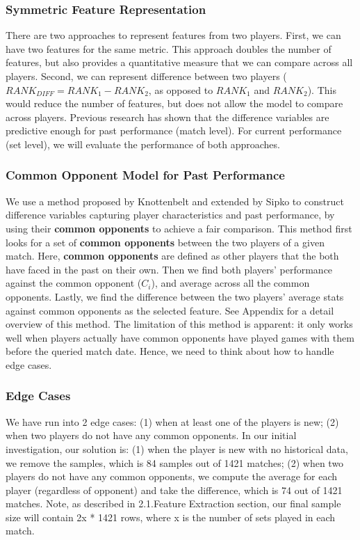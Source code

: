\documentclass[paper=a4, fontsize=11pt]{scrartcl} %
\numberwithin{equation}{section} %
\numberwithin{figure}{section} %
\numberwithin{table}{section} %
\begin{document}
\subsubsection{Symmetric Feature Representation}
There are two approaches to represent features from two players.  First, we can have two features for the same metric.  This approach doubles the number of features, but also provides a quantitative measure that we can compare across all players.  Second, we can represent difference between two players ($RANK_{DIFF} = RANK_1 - RANK_2$, as opposed to $RANK_1$ and $RANK_2$).  This would reduce the number of features, but does not allow the model to compare across players.  Previous research has shown that the difference variables are predictive enough \cite{tennis1} \cite{omalley} for past performance (match level).  For current performance (set level), we will evaluate the performance of both approaches.  
\subsubsection{Common Opponent Model for Past Performance}
We use a method proposed by Knottenbelt \cite{KNOTTENBELT20123820} and extended by Sipko \cite{tennis1} to construct difference variables capturing player characteristics and past performance, by using their \textbf{common opponents} to achieve a fair comparison. 
This method first looks for a set of \textbf{common opponents} between the two players of a given match. Here, \textbf{common opponents} are defined as other players that the both have faced in the past on their own. Then we find both players' performance against the common opponent ($C_i$), and average across all the common opponents. Lastly, we find the difference between the two players' average stats against common opponents as the selected feature.  See Appendix for a detail overview of this method.
The limitation of this method is apparent: it only works well when players actually have common opponents have played games with them before the queried match date. Hence, we need to think about how to handle edge cases.
\subsubsection{Edge Cases}
We have run into 2 edge cases: (1) when at least one of the players is new; (2) when two players do not have any common opponents.  In our initial investigation, our solution is: (1) when the player is new with no historical data, we remove the samples, which is 84 samples out of 1421 matches; (2) when two players do not have any common opponents, we compute the average for each player (regardless of opponent) and take the difference, which is 74 out of 1421 matches. Note, as described in 2.1.Feature Extraction section, our final sample size will contain 2x * 1421 rows, where x is the number of sets played in each match.
\end{document}
